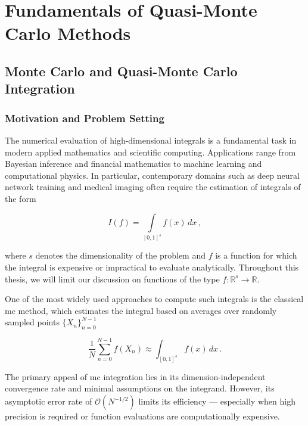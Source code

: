 \part{Fundamentals of Quasi-Monte Carlo Methods}
\label{part1}

\chapter{Monte Carlo and Quasi-Monte Carlo Integration}
\label{chapter1}

\section{Motivation and Problem Setting}
The numerical evaluation of high-dimensional integrals is a fundamental task in
modern applied mathematics and scientific computing. Applications range from
Bayesian inference and financial mathematics to machine learning and
computational physics. In particular, contemporary domains such as deep neural
network training and medical imaging often require the estimation of integrals
of the form

\begin{equation}
    \label{eq:integration_problem}
    I(f) = \int\limits_{[0,1]^s} f(x)\,dx\,,
\end{equation}

where $s$ denotes the dimensionality of the problem and $f$ is a function for
which the integral is expensive or impractical to evaluate analytically.
Throughout this thesis, we will limit our discussion on functions of the type
$f: \mathbb{R}^s \to \mathbb{R}$.

One of the most widely used approaches to compute such integrals is the
classical \ac{mc} method, which estimates the integral based on averages over
randomly sampled points $\{X_n\}_{n=0}^{N-1}$

\begin{equation*}
    \frac1N \sum_{n=0}^{N-1} f(X_n) \approx \int_{[0,1]^s} f(x)\,dx\,.
\end{equation*}

The primary appeal of \ac{mc} integration lies in its dimension-independent
convergence rate and minimal assumptions on the integrand. However, its
asymptotic error rate of $\mathcal{O}(N^{-1/2})$
\cite{leobacher2014introduction} limits its efficiency --- especially when high
precision is required or function evaluations are computationally expensive.

